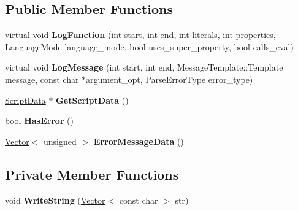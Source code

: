 \subsection*{Public Member Functions}
\begin{DoxyCompactItemize}
\item 
virtual void {\bfseries Log\+Function} (int start, int end, int literals, int properties, Language\+Mode language\+\_\+mode, bool uses\+\_\+super\+\_\+property, bool calls\+\_\+eval)\hypertarget{classv8_1_1internal_1_1_complete_parser_recorder_aae911d42b7261b82ce55cf8117bbe963}{}\label{classv8_1_1internal_1_1_complete_parser_recorder_aae911d42b7261b82ce55cf8117bbe963}

\item 
virtual void {\bfseries Log\+Message} (int start, int end, Message\+Template\+::\+Template message, const char $\ast$argument\+\_\+opt, Parse\+Error\+Type error\+\_\+type)\hypertarget{classv8_1_1internal_1_1_complete_parser_recorder_a6f2ef2d8a1759b8ab98d8394b02091f8}{}\label{classv8_1_1internal_1_1_complete_parser_recorder_a6f2ef2d8a1759b8ab98d8394b02091f8}

\item 
\hyperlink{classv8_1_1internal_1_1_script_data}{Script\+Data} $\ast$ {\bfseries Get\+Script\+Data} ()\hypertarget{classv8_1_1internal_1_1_complete_parser_recorder_a250c61a627236e468121e873908b3d88}{}\label{classv8_1_1internal_1_1_complete_parser_recorder_a250c61a627236e468121e873908b3d88}

\item 
bool {\bfseries Has\+Error} ()\hypertarget{classv8_1_1internal_1_1_complete_parser_recorder_a3c2eaa9eb33dc6709c9fad1fa5492cca}{}\label{classv8_1_1internal_1_1_complete_parser_recorder_a3c2eaa9eb33dc6709c9fad1fa5492cca}

\item 
\hyperlink{classv8_1_1internal_1_1_vector}{Vector}$<$ unsigned $>$ {\bfseries Error\+Message\+Data} ()\hypertarget{classv8_1_1internal_1_1_complete_parser_recorder_a190d770c5a6c4e684085d8b14ff39dab}{}\label{classv8_1_1internal_1_1_complete_parser_recorder_a190d770c5a6c4e684085d8b14ff39dab}

\end{DoxyCompactItemize}
\subsection*{Private Member Functions}
\begin{DoxyCompactItemize}
\item 
void {\bfseries Write\+String} (\hyperlink{classv8_1_1internal_1_1_vector}{Vector}$<$ const char $>$ str)\hypertarget{classv8_1_1internal_1_1_complete_parser_recorder_aa43440e4380710a7fbee1232c47762a9}{}\label{classv8_1_1internal_1_1_complete_parser_recorder_aa43440e4380710a7fbee1232c47762a9}

\end{DoxyCompactItemize}
